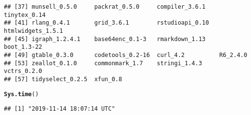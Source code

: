 \documentclass{article}\usepackage[]{graphicx}\usepackage[]{color}
\makeatletter
\newcommand{\hlstd}[1]{\textcolor[rgb]{0.345,0.345,0.345}{#1}}%
\newcommand{\hlkwd}[1]{\textcolor[rgb]{0.737,0.353,0.396}{\textbf{#1}}}%
\newenvironment{kframe}{%
 \def\at@end@of@kframe{}%
 \ifinner\ifhmode%
  \def\at@end@of@kframe{\end{minipage}}%
  \begin{minipage}{\columnwidth}%
 \fi\fi%
 \def\FrameCommand##1{\hskip\@totalleftmargin \hskip-\fboxsep
 \colorbox{shadecolor}{##1}\hskip-\fboxsep
     \hskip-\linewidth \hskip-\@totalleftmargin \hskip\columnwidth}%
 \MakeFramed {\advance\hsize-\width
   \@totalleftmargin\z@ \linewidth\hsize
   \@setminipage}}%
 {\par\unskip\endMakeFramed%
 \at@end@of@kframe}
\newenvironment{knitrout}{}{} %
\makeatother
\begin{document}
\begin{knitrout}
\begin{kframe}
\begin{verbatim}
## [37] munsell_0.5.0     packrat_0.5.0     compiler_3.6.1    tinytex_0.14     
## [41] rlang_0.4.1       grid_3.6.1        rstudioapi_0.10   htmlwidgets_1.5.1
## [45] igraph_1.2.4.1    base64enc_0.1-3   rmarkdown_1.13    boot_1.3-22      
## [49] gtable_0.3.0      codetools_0.2-16  curl_4.2          R6_2.4.0         
## [53] zeallot_0.1.0     commonmark_1.7    stringi_1.4.3     vctrs_0.2.0      
## [57] tidyselect_0.2.5  xfun_0.8
\end{verbatim}
\begin{alltt}
\hlkwd{Sys.time}\hlstd{()}
\end{alltt}
\begin{verbatim}
## [1] "2019-11-14 18:07:14 UTC"
\end{verbatim}
\end{kframe}
\end{knitrout}
\end{document}
